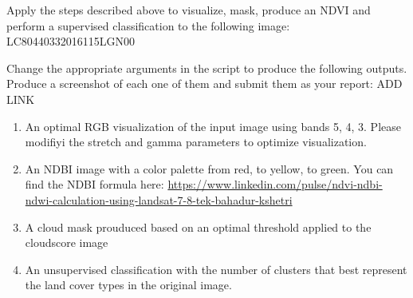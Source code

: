 \documentclass[]{article}
\newenvironment{Shaded}{\begin{snugshade}}{\end{snugshade}}
\begin{document}
Apply the steps described above to visualize, mask, produce an NDVI and
perform a supervised classification to the following image:
LC80440332016115LGN00

Change the appropriate arguments in the script to produce the following
outputs. Produce a screenshot of each one of them and submit them as
your report: ADD LINK

\begin{enumerate}
\def\labelenumi{\arabic{enumi}.}
\item
  An optimal RGB visualization of the input image using bands 5, 4, 3.
  Please modifiyi the stretch and gamma parameters to optimize
  visualization.
\item
  An NDBI image with a color palette from red, to yellow, to green. You
  can find the NDBI formula here:
  \url{https://www.linkedin.com/pulse/ndvi-ndbi-ndwi-calculation-using-landsat-7-8-tek-bahadur-kshetri}
\item
  A cloud mask prouduced based on an optimal threshold applied to the
  cloudscore image
\item
  An unsupervised classification with the number of clusters that best
  represent the land cover types in the original image.
\end{enumerate}

\begin{Shaded}
\begin{Highlighting}[]

\end{Highlighting}
\end{Shaded}
\end{document}
